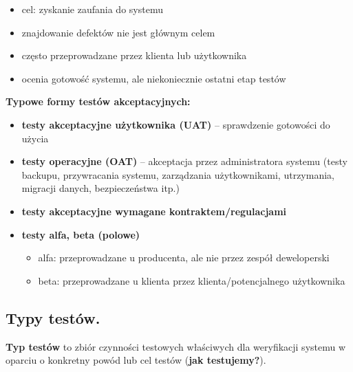 \documentclass[12pt]{article}
\begin{document}
    \begin{itemize}
        \item cel: zyskanie zaufania do systemu
        \item znajdowanie defektów nie jest głównym celem
        \item często przeprowadzane przez klienta lub użytkownika
        \item ocenia gotowość systemu, ale niekoniecznie ostatni etap testów
    \end{itemize}

    \noindent \textbf{Typowe formy testów akceptacyjnych:}
    \begin{itemize}
        \item \textbf{testy akceptacyjne użytkownika (UAT)} – sprawdzenie gotowości do użycia
        \item \textbf{testy operacyjne (OAT)} – akceptacja przez administratora systemu (testy
        backupu, przywracania systemu, zarządzania użytkownikami, utrzymania,
        migracji danych, bezpieczeństwa itp.)
        \item \textbf{testy akceptacyjne wymagane kontraktem/regulacjami}
        \item \textbf{testy alfa, beta (polowe)}
        \begin{itemize}
            \item alfa: przeprowadzane u producenta, ale nie przez zespół deweloperski
            \item beta: przeprowadzane u klienta przez klienta/potencjalnego użytkownika
        \end{itemize}
    \end{itemize}

    \subsection{Typy testów.}

    \begin{definition}
        \textbf{Typ testów} to zbiór czynności testowych właściwych dla weryfikacji systemu
        w oparciu o konkretny powód lub cel testów (\textbf{jak testujemy?}).
    \end{definition}
\end{document}
